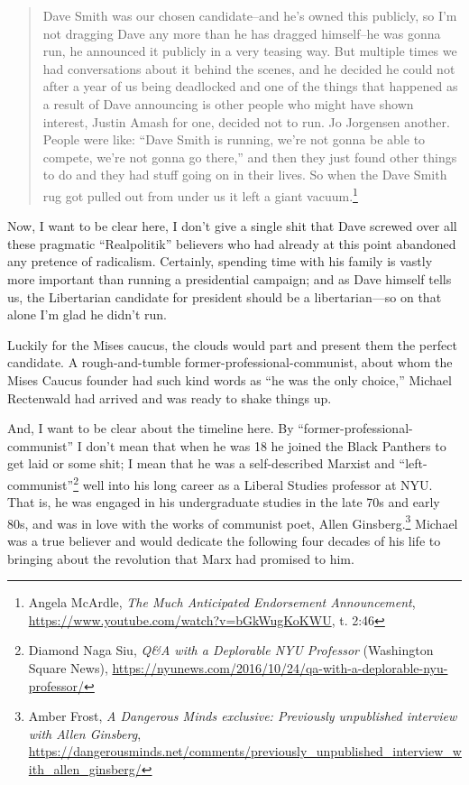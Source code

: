 \documentclass[11pt]{article}
\begin{document}
\begin{quote}
Dave Smith was our chosen candidate--and he's owned this publicly, so I'm not dragging Dave any more than he has dragged himself--he was gonna run, he announced it publicly in a very teasing way. But multiple times we had conversations about it behind the scenes, and he decided he could not after a year of us being deadlocked and one of the things that happened as a result of Dave announcing is other people who might have shown interest, Justin Amash for one, decided not to run. Jo Jorgensen another. People were like: ``Dave Smith is running, we're not gonna be able to compete, we're not gonna go there,'' and then they just found other things to do and they had stuff going on in their lives. So when the Dave Smith rug got pulled out from under us it left a giant vacuum.\footnote{Angela McArdle, \emph{The Much Anticipated Endorsement Announcement}, \url{https://www.youtube.com/watch?v=bGkWugKoKWU}, t. 2:46}
\end{quote}

Now, I want to be clear here, I don't give a single shit that Dave screwed over all these pragmatic ``Realpolitik'' believers who had already at this point abandoned any pretence of radicalism. Certainly, spending time with his family is vastly more important than running a presidential campaign; and as Dave himself tells us, the Libertarian candidate for president should be a libertarian---so on that alone I'm glad he didn't run.

Luckily for the Mises caucus, the clouds would part and present them the perfect candidate. A rough-and-tumble former-professional-communist, about whom the Mises Caucus founder had such kind words as ``he was the only choice,'' Michael Rectenwald had arrived and was ready to shake things up.

And, I want to be clear about the timeline here. By ``former-professional-communist'' I don't mean that when he was 18 he joined the Black Panthers to get laid or some shit; I mean that he was a self-described Marxist and ``left-communist''\footnote{Diamond Naga Siu, \emph{Q\&A with a Deplorable NYU Professor} (Washington Square News), \url{https://nyunews.com/2016/10/24/qa-with-a-deplorable-nyu-professor/}} well into his long career as a Liberal Studies professor at NYU. That is, he was engaged in his undergraduate studies in the late 70s and early 80s, and was in love with the works of communist poet, Allen Ginsberg.\footnote{Amber Frost, \emph{A Dangerous Minds exclusive: Previously unpublished interview with Allen Ginsberg}, \url{https://dangerousminds.net/comments/previously\_unpublished\_interview\_with\_allen\_ginsberg/}} Michael was a true believer and would dedicate the following four decades of his life to bringing about the revolution that Marx had promised to him.
\end{document}
